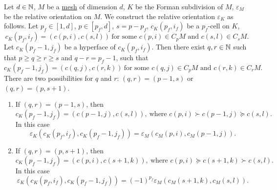 \begin{definition}
  Let
    $d \in \mathbb{N}$,
    $M$ be a \hyperref[cmc:mesh:definition]{mesh} of dimension $d$,
    $K$ be the Forman subdivision of $M$,
    $\varepsilon_M$ be the relative orientation on $M$.
  We construct the relative orientation $\varepsilon_K$ as follows.
  Let
    $p_f \in [1, d]$,
    $p \in [p_f, d]$,
    $s = p - p_f$,
    $c_K(p_f, i_f)$ be a $p_f$-cell on $K$,
  \begin{equation}
    c_K(p_f, i_f) = (c(p, i), c(s, l))\
    \text{for some $c(p, i) \in C_p M$ and $c(s, l) \in C_s M$}.
  \end{equation}
  Let $c_K(p_f - 1, j_f)$ be a hyperface of $c_K(p_f, i_f)$.
  Then there exist $q, r \in \mathbb{N}$ such that
  $p \geq q \geq r \geq s$ and $q - r = p_f - 1$,
  such that
  \begin{equation}
    c_K(p_f - 1, j_f) = (c(q, j), c(r, k))\
    \text{for some $c(q, j) \in C_p M$ and $c(r, k) \in C_r M$}.
  \end{equation}
  There are two possibilities for $q$ and $r$:
  $(q, r) = (p - 1, s)$ or $(q, r) = (p, s + 1)$.
  \begin{enumerate}
    \item
      If $(q, r) = (p - 1, s)$, then
      \begin{equation}
        c_K(p_f - 1, j_f) = (c(p - 1, j), c(s, l)),\
        \text{where $c(p, i) \succ c(p - 1, j) \succeq c(s, l)$}.
      \end{equation}
      In this case
      \begin{equation}
        \varepsilon_K(c_K(p_f, i_f), c_K(p_f - 1, j_f))
        = \varepsilon_M(c_M(p, i), c_M(p - 1, j)).
      \end{equation}
    \item
      If $(q, r) = (p, s + 1)$, then
      \begin{equation}
        c_K(p_f - 1, j_f) = (c(p, i), c(s + 1, k)),\
        \text{where $c(p, i) \succeq c(s + 1, k) \succ c(s, l)$}.
      \end{equation}
      In this case
      \begin{equation}
        \varepsilon_K(c_K(p_f, i_f), c_K(p_f - 1, j_f))
        = (-1)^{p_f} \varepsilon_M(c_M(s + 1, k), c_M(s, l)).
      \end{equation}
  \end{enumerate}
\end{definition}
